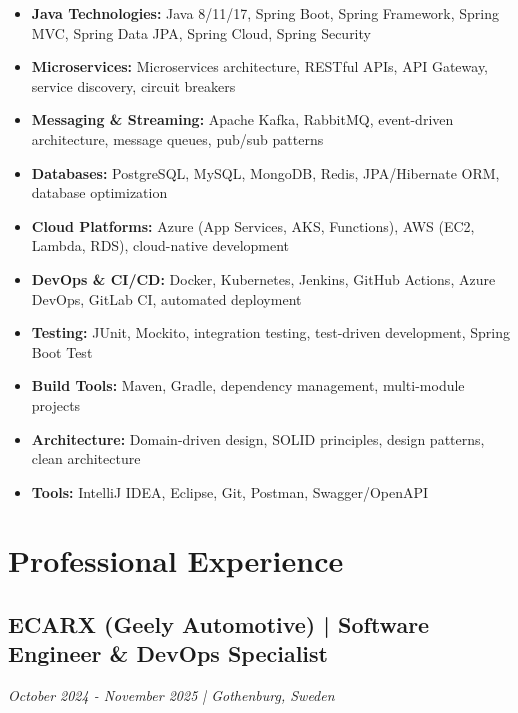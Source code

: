\documentclass[11pt,a4paper]{article}
\begin{document}
\begin{itemize}[leftmargin=*, itemsep=2pt]
\item \textbf{Java Technologies:} Java 8/11/17, Spring Boot, Spring Framework, Spring MVC, Spring Data JPA, Spring Cloud, Spring Security
\item \textbf{Microservices:} Microservices architecture, RESTful APIs, API Gateway, service discovery, circuit breakers
\item \textbf{Messaging \& Streaming:} Apache Kafka, RabbitMQ, event-driven architecture, message queues, pub/sub patterns
\item \textbf{Databases:} PostgreSQL, MySQL, MongoDB, Redis, JPA/Hibernate ORM, database optimization
\item \textbf{Cloud Platforms:} Azure (App Services, AKS, Functions), AWS (EC2, Lambda, RDS), cloud-native development
\item \textbf{DevOps \& CI/CD:} Docker, Kubernetes, Jenkins, GitHub Actions, Azure DevOps, GitLab CI, automated deployment
\item \textbf{Testing:} JUnit, Mockito, integration testing, test-driven development, Spring Boot Test
\item \textbf{Build Tools:} Maven, Gradle, dependency management, multi-module projects
\item \textbf{Architecture:} Domain-driven design, SOLID principles, design patterns, clean architecture
\item \textbf{Tools:} IntelliJ IDEA, Eclipse, Git, Postman, Swagger/OpenAPI
\end{itemize}

\section*{Professional Experience}

\subsection*{ECARX (Geely Automotive) | Software Engineer \& DevOps Specialist}
\textit{October 2024 - November 2025 | Gothenburg, Sweden}
\end{document}
